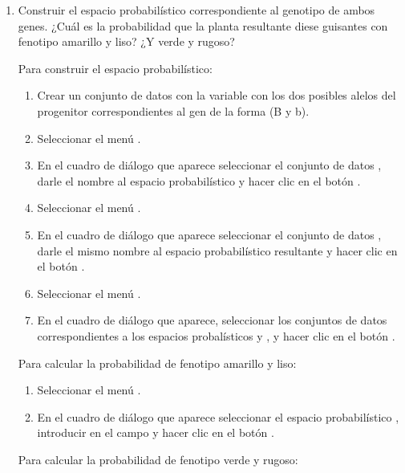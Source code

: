 \begin{enumerate}[leftmargin=*]
\begin{enumerate}
\item Construir el espacio probabilístico correspondiente al genotipo de ambos genes. 
¿Cuál es la probabilidad que la planta resultante diese guisantes con fenotipo amarillo y liso? 
¿Y verde y rugoso?
\begin{indicacion}
Para construir el espacio probabilístico: 
\begin{enumerate}
\item Crear un conjunto de datos  con la variable  con los dos posibles alelos del
progenitor correspondientes al gen de la forma (B y b).
\item Seleccionar el menú .
\item En el cuadro de diálogo que aparece seleccionar el conjunto de datos , darle el nombre
 al espacio probabilístico y hacer clic en el botón .
\item Seleccionar el menú .
\item En el cuadro de diálogo que aparece seleccionar el conjunto de datos , darle el mismo nombre al espacio
probabilístico resultante y hacer clic en el botón . 
\item Seleccionar el menú .
\item En el cuadro de diálogo que aparece, seleccionar los conjuntos de datos correspondientes a los espacios probalísticos
 y , y hacer clic en el botón .
\end{enumerate}
Para calcular la probabilidad de fenotipo amarillo y liso:
\begin{enumerate}
\item Seleccionar el menú .
\item En el cuadro de diálogo que aparece seleccionar el espacio probabilístico , introducir
 en el campo  y hacer clic en el botón .
\end{enumerate}
Para calcular la probabilidad de fenotipo verde y rugoso:

\end{indicacion}
\end{enumerate}
\end{enumerate}
